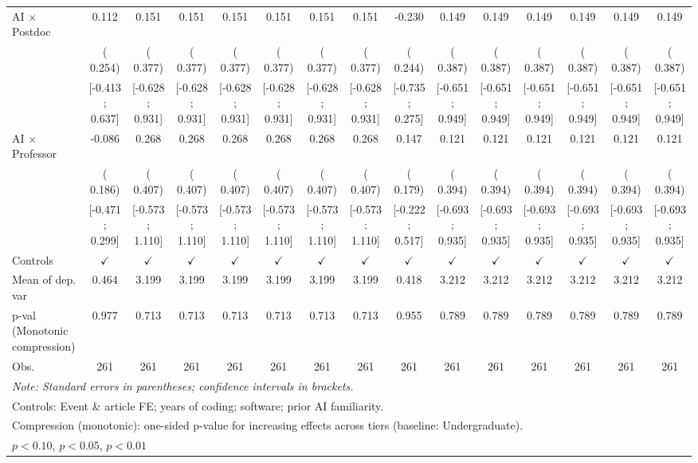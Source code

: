 \begin{tabular}{l*{14}{c}}
\\
AI × Postdoc &  0.112 &  0.151 &  0.151 &  0.151 &  0.151 &  0.151 &  0.151 & -0.230 &  0.149 &  0.149 &  0.149 &  0.149 &  0.149 &  0.149
\\
 & ( 0.254) & ( 0.377) & ( 0.377) & ( 0.377) & ( 0.377) & ( 0.377) & ( 0.377) & ( 0.244) & ( 0.387) & ( 0.387) & ( 0.387) & ( 0.387) & ( 0.387) & ( 0.387)
\\
 & [-0.413;  0.637] & [-0.628;  0.931] & [-0.628;  0.931] & [-0.628;  0.931] & [-0.628;  0.931] & [-0.628;  0.931] & [-0.628;  0.931] & [-0.735;  0.275] & [-0.651;  0.949] & [-0.651;  0.949] & [-0.651;  0.949] & [-0.651;  0.949] & [-0.651;  0.949] & [-0.651;  0.949]
\\
AI × Professor & -0.086 &  0.268 &  0.268 &  0.268 &  0.268 &  0.268 &  0.268 &  0.147 &  0.121 &  0.121 &  0.121 &  0.121 &  0.121 &  0.121
\\
 & ( 0.186) & ( 0.407) & ( 0.407) & ( 0.407) & ( 0.407) & ( 0.407) & ( 0.407) & ( 0.179) & ( 0.394) & ( 0.394) & ( 0.394) & ( 0.394) & ( 0.394) & ( 0.394)
\\
 & [-0.471;  0.299] & [-0.573;  1.110] & [-0.573;  1.110] & [-0.573;  1.110] & [-0.573;  1.110] & [-0.573;  1.110] & [-0.573;  1.110] & [-0.222;  0.517] & [-0.693;  0.935] & [-0.693;  0.935] & [-0.693;  0.935] & [-0.693;  0.935] & [-0.693;  0.935] & [-0.693;  0.935]
\\
\hline
Controls & $\checkmark$ & $\checkmark$ & $\checkmark$ & $\checkmark$ & $\checkmark$ & $\checkmark$ & $\checkmark$ & $\checkmark$ & $\checkmark$ & $\checkmark$ & $\checkmark$ & $\checkmark$ & $\checkmark$ & $\checkmark$
\\
Mean of dep. var &  0.464 &  3.199 &  3.199 &  3.199 &  3.199 &  3.199 &  3.199 &  0.418 &  3.212 &  3.212 &  3.212 &  3.212 &  3.212 &  3.212
\\
p-val (Monotonic compression) &  0.977 &  0.713 &  0.713 &  0.713 &  0.713 &  0.713 &  0.713 &  0.955 &  0.789 &  0.789 &  0.789 &  0.789 &  0.789 &  0.789
\\
Obs. & 261 & 261 & 261 & 261 & 261 & 261 & 261 & 261 & 261 & 261 & 261 & 261 & 261 & 261
\\
\hline
\hline\hline
\multicolumn{15}{l}{\it{Note:} Standard errors in parentheses; confidence intervals in brackets.}\\
\multicolumn{15}{l}{Controls: Event \& article FE; years of coding; software; prior AI familiarity.}\\
\multicolumn{15}{l}{Compression (monotonic): one-sided p-value for increasing effects across tiers (baseline: Undergraduate).}\\
\multicolumn{15}{l}{\sym{*} $p<0.10$, \sym{**} $p<0.05$,  \sym{***} $p<0.01$}\\
\end{tabular}
